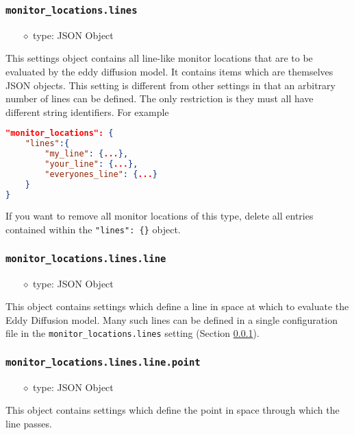 \documentclass[]{article}
\def\code#1{\texttt{#1}}
\begin{document}
\subsubsection{\code{monitor\_locations.lines}}\label{sec:monlines}
\begin{itemize}
    \item[$\diamond$] type: JSON Object 
\end{itemize}
This settings object contains all line-like monitor locations that are to be
evaluated by the eddy diffusion model. It contains items which
are themselves JSON objects. This setting is different from other settings in
that an arbitrary number of lines can be defined. The only restriction is they
must all have different string identifiers. For example\\
\begin{lstlisting}[language=json,firstnumber=1]
"monitor_locations": {
    "lines":{
        "my_line": {...},
        "your_line": {...},
        "everyones_line": {...}
    }
}
\end{lstlisting}
\medskip

\noindent If you want to remove all monitor locations of this type, delete all
entries contained within the \code{"lines": \{\}} object.

\subsubsection{\code{monitor\_locations.lines.line}}
\begin{itemize}
    \item[$\diamond$] type: JSON Object 
\end{itemize}
This object contains settings which define a line in space at which to evaluate
the Eddy Diffusion model. Many such lines can be defined in a single
configuration file in the \code{monitor\_locations.lines} setting (Section
\ref{sec:monlines}).

\subsubsection{\code{monitor\_locations.lines.line.point}}
\begin{itemize}
    \item[$\diamond$] type: JSON Object 
\end{itemize}
This object contains settings which define the point in space through which the
line passes.
\end{document}
